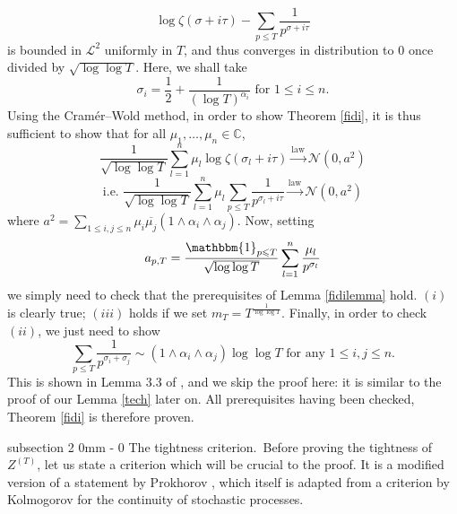 \documentclass{article}
\makeatletter
\newcommand{\dsum}{\displaystyle\sum}
\newcommand{\1}{\mathds{1}}
\numberwithin{equation}{section}
\renewcommand{\leq}{\leqslant}
\newcommand{\C}{\mathbb{C}}
\theoremstyle{plain} %
\renewcommand{\subsection}{\@startsection
{subsection}%
{2}%
{0mm}%
{-\baselineskip}%
{0 \baselineskip}%
{\normalfont\bf\itshape}} %
\newcommand{\hf}{\frac{1}{2}}
\makeatother
\begin{document}
\begin{equation}
    \log \zeta (\sigma + i \tau) - \sum_{p \leq T} \frac{1}{p^{\sigma + i \tau}}
\end{equation}
is bounded in $\mathcal{L}^2$ uniformly in $T$, and thus converges in distribution to $0$ once divided by $\sqrt{\log \log T}$. Here, we shall take 
\begin{equation}
    \sigma_i = \hf + \frac{1}{(\log T)^{\alpha_i}} \text{ for }1 \leq i \leq n.
\end{equation}
Using the Cramér–Wold method, in order to show Theorem \ref{fidi}, it is thus sufficient to show that for all $\mu_1, \ldots, \mu_n \in \C$,
\begin{equation}
    \frac{1}{\sqrt{\log \log T}}\sum_{l=1}^n \mu_l \log \zeta(\sigma_l + i \tau) \overset{\text{law}}{\longrightarrow} \mathscr{N}(0, a^2)
\end{equation}
\begin{equation*}
    \text{i.e. } \frac{1}{\sqrt{\log \log T}} \sum_{l = 1}^n \mu_l \sum_{p \leq T} \frac{1}{p^{\sigma_l + i \tau}}  \overset{\text{law}}{\longrightarrow} \mathscr{N}(0, a^2)
\end{equation*}
where $a^2 = \dsum_{1 \leq i, j \leq n} \mu_i \overline{\mu_j} (1 \land \alpha_i \land \alpha_j)$. Now, setting
\begin{equation}
    a_{p, T} = \dfrac{\mathbbm{1}_{p \leq T}}{\sqrt{\log \log T}} \sum_{l = 1}^n \dfrac{\mu_l}{p^{\sigma_l}}
\end{equation}
we simply need to check that the prerequisites of Lemma \ref{fidilemma} hold. $(i)$ is clearly true; $(iii)$ holds if we set $m_T = T^{\frac{1}{\log \log T}}$. Finally, in order to check $(ii)$, we just need to show
\begin{equation}
    \sum_{p \leq T} \dfrac{1}{p^{\sigma_i + \sigma_j}} \sim (1 \land\alpha_i \land \alpha_j) \log \log T \text{ for any }1 \leq i, j \leq n.
\end{equation}
This is shown in Lemma 3.3 of \cite{bourgade}, and we skip the proof here: it is similar to the proof of our Lemma \ref{tech} later on. All prerequisites having been checked, Theorem \ref{fidi} is therefore proven.

\subsection{The tightness criterion.}\ 
Before proving the tightness of $Z^{(T)}$, let us state a criterion which will be crucial to the proof. It is a modified version of a statement by Prokhorov \cite[Theorem 2.1]{prokh}, which itself is adapted from a criterion by Kolmogorov for the continuity of stochastic processes.
\end{document}
